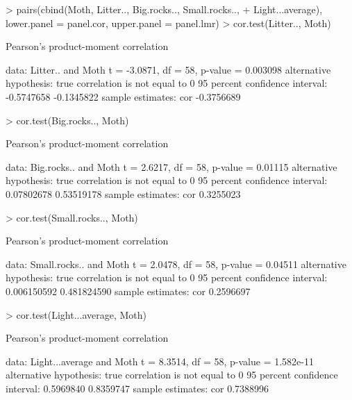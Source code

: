 \documentclass[a4paper]{article}
\begin{document}
\begin{Schunk}
\begin{Sinput}
> pairs(cbind(Moth, Litter.., Big.rocks.., Small.rocks.., 
+     Light...average), lower.panel = panel.cor, upper.panel = panel.lmr)
> cor.test(Litter.., Moth)
\end{Sinput}
\begin{Soutput}
	Pearson's product-moment correlation

data:  Litter.. and Moth 
t = -3.0871, df = 58, p-value = 0.003098
alternative hypothesis: true correlation is not equal to 0 
95 percent confidence interval:
 -0.5747658 -0.1345822 
sample estimates:
       cor 
-0.3756689 
\end{Soutput}
\begin{Sinput}
> cor.test(Big.rocks.., Moth)
\end{Sinput}
\begin{Soutput}
	Pearson's product-moment correlation

data:  Big.rocks.. and Moth 
t = 2.6217, df = 58, p-value = 0.01115
alternative hypothesis: true correlation is not equal to 0 
95 percent confidence interval:
 0.07802678 0.53519178 
sample estimates:
      cor 
0.3255023 
\end{Soutput}
\begin{Sinput}
> cor.test(Small.rocks.., Moth)
\end{Sinput}
\begin{Soutput}
	Pearson's product-moment correlation

data:  Small.rocks.. and Moth 
t = 2.0478, df = 58, p-value = 0.04511
alternative hypothesis: true correlation is not equal to 0 
95 percent confidence interval:
 0.006150592 0.481824590 
sample estimates:
      cor 
0.2596697 
\end{Soutput}
\begin{Sinput}
> cor.test(Light...average, Moth)
\end{Sinput}
\begin{Soutput}
	Pearson's product-moment correlation

data:  Light...average and Moth 
t = 8.3514, df = 58, p-value = 1.582e-11
alternative hypothesis: true correlation is not equal to 0 
95 percent confidence interval:
 0.5969840 0.8359747 
sample estimates:
      cor 
0.7388996 
\end{Soutput}
\end{Schunk}
\end{document}
